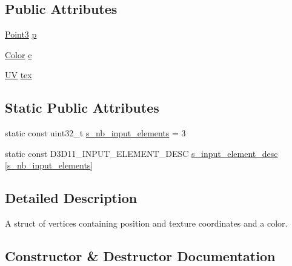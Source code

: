 \subsection*{Public Attributes}
\begin{DoxyCompactItemize}
\item 
\hyperlink{structmage_1_1_point3}{Point3} \hyperlink{structmage_1_1_vertex_position_color_texture_a145c2e2fce90b07252b778b46e31ea24}{p}
\item 
\hyperlink{structmage_1_1_color}{Color} \hyperlink{structmage_1_1_vertex_position_color_texture_afb9ec100ec42e83e501448d4bb0ee4f8}{c}
\item 
\hyperlink{structmage_1_1_u_v}{UV} \hyperlink{structmage_1_1_vertex_position_color_texture_adfbaa105e46bb65f502ec33eaa2e8b15}{tex}
\end{DoxyCompactItemize}
\subsection*{Static Public Attributes}
\begin{DoxyCompactItemize}
\item 
static const uint32\+\_\+t \hyperlink{structmage_1_1_vertex_position_color_texture_a6b05ba63dce3ba54ad4b1b39b3c6f4f8}{s\+\_\+nb\+\_\+input\+\_\+elements} = 3
\item 
static const D3\+D11\+\_\+\+I\+N\+P\+U\+T\+\_\+\+E\+L\+E\+M\+E\+N\+T\+\_\+\+D\+E\+SC \hyperlink{structmage_1_1_vertex_position_color_texture_a19df72ffa15fae0b389b9f66d7b8f3bd}{s\+\_\+input\+\_\+element\+\_\+desc} \mbox{[}\hyperlink{structmage_1_1_vertex_position_color_texture_a6b05ba63dce3ba54ad4b1b39b3c6f4f8}{s\+\_\+nb\+\_\+input\+\_\+elements}\mbox{]}
\end{DoxyCompactItemize}


\subsection{Detailed Description}
A struct of vertices containing position and texture coordinates and a color. 

\subsection{Constructor \& Destructor Documentation}
\hypertarget{structmage_1_1_vertex_position_color_texture_a49020fb0c115c3dc3c94471fcbc30a82}{}\label{structmage_1_1_vertex_position_color_texture_a49020fb0c115c3dc3c94471fcbc30a82} 

